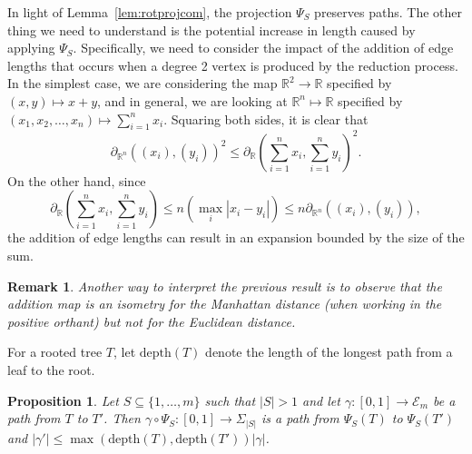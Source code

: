 \documentclass[a4paper,11pt]{article}
\newtheorem{proposition}[theorem]{Proposition}
\newtheorem{remark}[theorem]{Remark}
\newcommand{\aE}{\mathcal{E}}
\newcommand{\depth}{\textrm{depth}}
\begin{document}
In light of Lemma~\ref{lem:rotprojcom}, the projection $\Psi_S$ preserves paths.
The other thing we need to understand is the potential increase in length caused by applying $\Psi_S$.
Specifically, we need to consider the impact of the addition of edge lengths that occurs when a degree 2 vertex is produced by the reduction process.
In the simplest case, we are considering the map $\mathbb{R}^2 \to \mathbb{R}$ specified by $(x,y) \mapsto x+y$, and in general, we are looking at $\mathbb{R}^n \mapsto \mathbb{R}$ specified by $(x_1, x_2, \ldots, x_n) \mapsto \sum_{i=1}^n x_i$.
Squaring both sides, it is clear that
\[
\partial_{\mathbb{R}^n}((x_i), (y_i))^2 \leq \partial_{\mathbb{R}}(\sum_{i=1}^n x_i, \sum_{i=1}^n y_i)^2.
\]
On the other hand, since 
\[
\partial_{\mathbb{R}}(\sum_{i=1}^n x_i, \sum_{i=1}^n y_i) \leq n(\max_i |x_i - y_i|) \leq n \partial_{\mathbb{R}^n}((x_i), (y_i)),
\]
the addition of edge lengths can result in an expansion bounded by the size of the sum.

\begin{remark}
Another way to interpret the previous result is to observe that the addition map is an isometry for the Manhattan distance (when working in the positive orthant) but not for the Euclidean distance.
\end{remark}

For a rooted tree $T$, let $\depth(T)$ denote the length of the longest path from a leaf to the root.

\begin{proposition}\label{prop:projcont}
Let $S \subseteq \{1,\ldots,m\}$ such that $|S| > 1$ and let $\gamma \colon [0,1] \to \aE_m$ be a path from $T$ to $T'$.
Then $\gamma \circ \Psi_S \colon [0,1] \to \Sigma_{|S|}$ is a path from $\Psi_S(T)$ to $\Psi_S(T')$ and $|\gamma'| \leq \max(\depth(T), \depth(T')) |\gamma|$.
\end{proposition}
\end{document}

